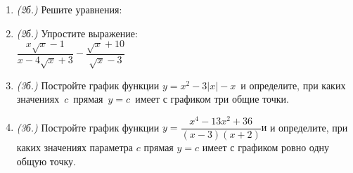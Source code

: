 \documentclass[12pt, a4paper]{article}
\begin{document}
	   \cfoot{}
	\begin{enumerate}[label=\textbf{\arabic*.}]
		\item \textit{(2б.)} Решите уравнения:
		\begin{enumerate}[label=\asbuk*)]
		\end{enumerate}
		\item \textit{(2б.)} Упростите выражение: \\
		$\dfrac{x\sqrt{x}-1}{x-4\sqrt{x}+3}-\dfrac{\sqrt{x}+10}{\sqrt{x}-3}$
		\item \textit{(3б.)} Постройте график функции $y=x^2-3|x|-x$  и определите, при каких значениях  $c$  прямая  $y=c$  имеет с графиком три общие точки.
		\item \textit{(3б.)} Постройте график функции $y=\dfrac{x^4-13x^2+36}{(x-3)(x+2)}и$  и определите, при каких значениях параметра $c$ прямая $y=c$ имеет с графиком ровно одну общую точку.
	\end{enumerate}
\end{document}
